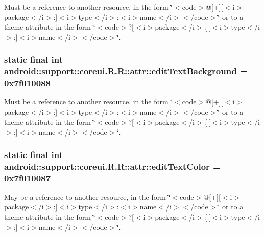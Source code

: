 Must be a reference to another resource, in the form \char`\"{}$<$code$>$@\mbox{[}+\mbox{]}\mbox{[}$<$i$>$package$<$/i$>$:\mbox{]}$<$i$>$type$<$/i$>$:$<$i$>$name$<$/i$>$$<$/code$>$\char`\"{} or to a theme attribute in the form \char`\"{}$<$code$>$?\mbox{[}$<$i$>$package$<$/i$>$:\mbox{]}\mbox{[}$<$i$>$type$<$/i$>$:\mbox{]}$<$i$>$name$<$/i$>$$<$/code$>$\char`\"{}. \hypertarget{classandroid_1_1support_1_1coreui_1_1_r_1_1attr_9e75da8d03b12cbc23bd2c3b20438ac6}{
\subsubsection[{editTextBackground}]{\setlength{\rightskip}{0pt plus 5cm}static final int android::support::coreui.R.R::attr::editTextBackground = 0x7f010088}}
\label{classandroid_1_1support_1_1coreui_1_1_r_1_1attr_9e75da8d03b12cbc23bd2c3b20438ac6}


Must be a reference to another resource, in the form \char`\"{}$<$code$>$@\mbox{[}+\mbox{]}\mbox{[}$<$i$>$package$<$/i$>$:\mbox{]}$<$i$>$type$<$/i$>$:$<$i$>$name$<$/i$>$$<$/code$>$\char`\"{} or to a theme attribute in the form \char`\"{}$<$code$>$?\mbox{[}$<$i$>$package$<$/i$>$:\mbox{]}\mbox{[}$<$i$>$type$<$/i$>$:\mbox{]}$<$i$>$name$<$/i$>$$<$/code$>$\char`\"{}. \hypertarget{classandroid_1_1support_1_1coreui_1_1_r_1_1attr_164454573a252f9b295b97e920fe589c}{
\subsubsection[{editTextColor}]{\setlength{\rightskip}{0pt plus 5cm}static final int android::support::coreui.R.R::attr::editTextColor = 0x7f010087}}
\label{classandroid_1_1support_1_1coreui_1_1_r_1_1attr_164454573a252f9b295b97e920fe589c}


May be a reference to another resource, in the form \char`\"{}$<$code$>$@\mbox{[}+\mbox{]}\mbox{[}$<$i$>$package$<$/i$>$:\mbox{]}$<$i$>$type$<$/i$>$:$<$i$>$name$<$/i$>$$<$/code$>$\char`\"{} or to a theme attribute in the form \char`\"{}$<$code$>$?\mbox{[}$<$i$>$package$<$/i$>$:\mbox{]}\mbox{[}$<$i$>$type$<$/i$>$:\mbox{]}$<$i$>$name$<$/i$>$$<$/code$>$\char`\"{}. 

